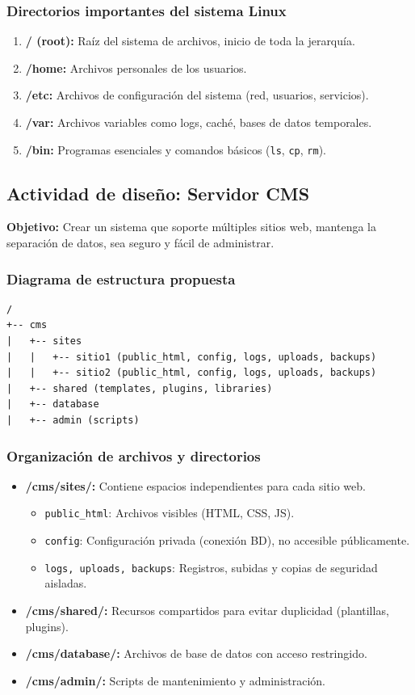 \documentclass[stu, 12pt, letterpaper, donotrepeattitle, floatsintext, noapacite]{apa7}
\begin{document}
\subsubsection{Directorios importantes del sistema Linux}
\begin{enumerate}
    \item \textbf{/ (root):} Raíz del sistema de archivos, inicio de toda la jerarquía.
    \item \textbf{/home:} Archivos personales de los usuarios.
    \item \textbf{/etc:} Archivos de configuración del sistema (red, usuarios, servicios).
    \item \textbf{/var:} Archivos variables como logs, caché, bases de datos temporales.
    \item \textbf{/bin:} Programas esenciales y comandos básicos (\texttt{ls}, \texttt{cp}, \texttt{rm}).
\end{enumerate}

\subsection{Actividad de diseño: Servidor CMS}
\textbf{Objetivo:} Crear un sistema que soporte múltiples sitios web, mantenga la separación de datos, sea seguro y fácil de administrar.

\subsubsection{Diagrama de estructura propuesta}
\begin{verbatim}
/
+-- cms
|   +-- sites
|   |   +-- sitio1 (public_html, config, logs, uploads, backups)
|   |   +-- sitio2 (public_html, config, logs, uploads, backups)
|   +-- shared (templates, plugins, libraries)
|   +-- database
|   +-- admin (scripts)
\end{verbatim}

\subsubsection{Organización de archivos y directorios}
\begin{itemize}
    \item \textbf{/cms/sites/:} Contiene espacios independientes para cada sitio web.
    \begin{itemize}
        \item \texttt{public\_html}: Archivos visibles (HTML, CSS, JS).
        \item \texttt{config}: Configuración privada (conexión BD), no accesible públicamente.
        \item \texttt{logs, uploads, backups}: Registros, subidas y copias de seguridad aisladas.
    \end{itemize}
    \item \textbf{/cms/shared/:} Recursos compartidos para evitar duplicidad (plantillas, plugins).
    \item \textbf{/cms/database/:} Archivos de base de datos con acceso restringido.
    \item \textbf{/cms/admin/:} Scripts de mantenimiento y administración.
\end{itemize}
\end{document}
